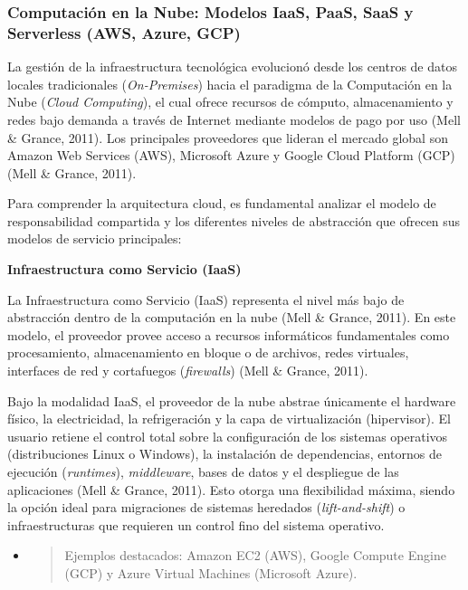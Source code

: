 \hypertarget{computaciuxf3n-en-la-nube-modelos-iaas-paas-saas-y-serverless-aws-azure-gcp}{%
\subsubsection{\texorpdfstring{\textbf{Computación en la Nube: Modelos
IaaS, PaaS, SaaS y Serverless (AWS, Azure,
GCP)}}{Computación en la Nube: Modelos IaaS, PaaS, SaaS y Serverless (AWS, Azure, GCP)}}\label{computaciuxf3n-en-la-nube-modelos-iaas-paas-saas-y-serverless-aws-azure-gcp}}

La gestión de la infraestructura tecnológica evolucionó desde los
centros de datos locales tradicionales (\emph{On-Premises}) hacia el
paradigma de la Computación en la Nube (\emph{Cloud Computing}), el cual
ofrece recursos de cómputo, almacenamiento y redes bajo demanda a través
de Internet mediante modelos de pago por uso (Mell \& Grance, 2011). Los
principales proveedores que lideran el mercado global son Amazon Web
Services (AWS), Microsoft Azure y Google Cloud Platform (GCP) (Mell \&
Grance, 2011).

Para comprender la arquitectura cloud, es fundamental analizar el modelo
de responsabilidad compartida y los diferentes niveles de abstracción
que ofrecen sus modelos de servicio principales:

\textbf{Infraestructura como Servicio (IaaS)}

La Infraestructura como Servicio (IaaS) representa el nivel más bajo de
abstracción dentro de la computación en la nube (Mell \& Grance, 2011).
En este modelo, el proveedor provee acceso a recursos informáticos
fundamentales como procesamiento, almacenamiento en bloque o de
archivos, redes virtuales, interfaces de red y cortafuegos
(\emph{firewalls}) (Mell \& Grance, 2011).

Bajo la modalidad IaaS, el proveedor de la nube abstrae únicamente el
hardware físico, la electricidad, la refrigeración y la capa de
virtualización (hipervisor). El usuario retiene el control total sobre
la configuración de los sistemas operativos (distribuciones Linux o
Windows), la instalación de dependencias, entornos de ejecución
(\emph{runtimes}), \emph{middleware}, bases de datos y el despliegue de
las aplicaciones (Mell \& Grance, 2011). Esto otorga una flexibilidad
máxima, siendo la opción ideal para migraciones de sistemas heredados
(\emph{lift-and-shift}) o infraestructuras que requieren un control fino
del sistema operativo.

\begin{itemize}
\item
  \begin{quote}
  Ejemplos destacados: Amazon EC2 (AWS), Google Compute Engine (GCP) y
  Azure Virtual Machines (Microsoft Azure).
  \end{quote}
\end{itemize}

